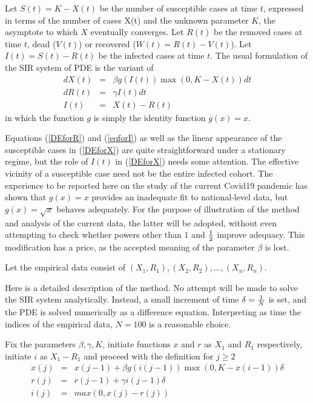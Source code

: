 \documentclass{article}
\begin{document}
\bigskip

Let $S(t) = K - X(t)$ be the number of susceptible cases at time $t$, expressed in terms of the number of cases X(t) and the unknown parameter $K$, the asymptote to which $X$ eventually converges. Let $R(t)$ be the removed cases at time $t$, dead ($V(t)$) or recovered ($W(t)=R(t)-V(t)$). Let $I(t)=S(t)-R(t)$ be the infected cases at time $t$. The usual formulation of the SIR system of PDE is the variant of
\begin{eqnarray}
dX(t) & = & \beta g(I(t)) \max(0,K - X(t)) dt \label{DEforX} \\
dR(t) & = & \gamma I(t) \label{DEforR} dt \\
I(t) & = & X(t)-R(t) \label{eqforI}
\end{eqnarray}
in which the function $g$ is simply the identity function $g(x)=x$.

Equations (\ref{DEforR}) and (\ref{eqforI}) as well as the linear appearance of the susceptible cases in (\ref{DEforX}) are quite straightforward under a stationary regime, but the role of $I(t)$ in (\ref{DEforX}) needs some attention. The effective vicinity of a susceptible case need not be the entire infected cohort. The experience to be reported here on the study of the current Covid19 pandemic has shown that $g(x)=x$ provides an inadequate fit to national-level data, but $g(x)=\sqrt{x}$ behaves adequately. For the purpose of illustration of the method and analysis of the current data, the latter will be adopted, without even attempting to check whether powers other than $1$ and ${1 \over 2}$ improve adequacy. This modification has a price, as the accepted meaning of the parameter $\beta$ is lost.

\bigskip

Let the empirical data consist of $(X_1,R_1), (X_2,R_2), \dots, (X_n, R_n)$. 

Here is a detailed description of the method. No attempt will be made to solve the SIR system analytically. Instead, a small increment of time $\delta={1 \over N}$ is set, and the PDE is solved numerically as a difference equation. Interpreting as time the indices of the empirical data, $N=100$ is a reasonable choice.

Fix the parameters $\beta, \gamma, K$, initiate functions $x$ and $r$ as $X_1$ and $R_1$ respectively, initiate $i$ as $X_1-R_1$ and proceed with the definition for $j \ge 2$
\begin{eqnarray}
x(j)&=&x(j-1)+\beta g(i(j-1))\max(0,K-x(i-1)) \delta \nonumber \\
r(j)&=&r(j-1)+\gamma i(j-1) \delta \nonumber \\
i(j)&=&max(0,x(j)-r(j)) \label{thesolution}
\end{eqnarray}
\end{document}
